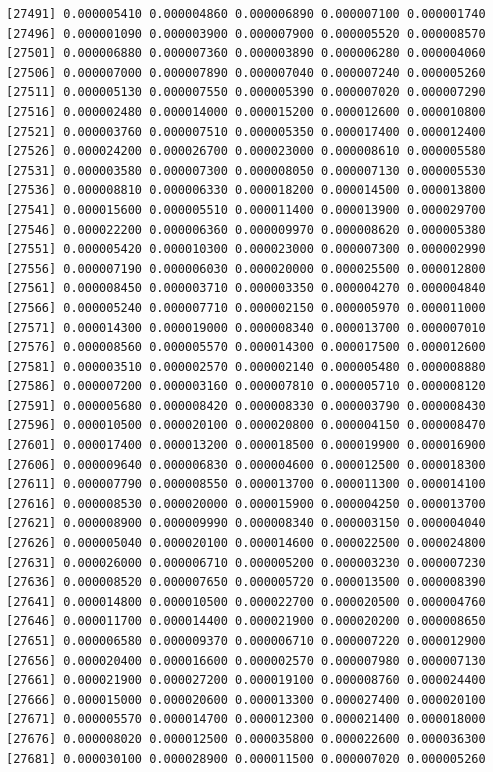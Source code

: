 \documentclass[]{article}
\begin{document}
\begin{verbatim}
[27491] 0.000005410 0.000004860 0.000006890 0.000007100 0.000001740
[27496] 0.000001090 0.000003900 0.000007900 0.000005520 0.000008570
[27501] 0.000006880 0.000007360 0.000003890 0.000006280 0.000004060
[27506] 0.000007000 0.000007890 0.000007040 0.000007240 0.000005260
[27511] 0.000005130 0.000007550 0.000005390 0.000007020 0.000007290
[27516] 0.000002480 0.000014000 0.000015200 0.000012600 0.000010800
[27521] 0.000003760 0.000007510 0.000005350 0.000017400 0.000012400
[27526] 0.000024200 0.000026700 0.000023000 0.000008610 0.000005580
[27531] 0.000003580 0.000007300 0.000008050 0.000007130 0.000005530
[27536] 0.000008810 0.000006330 0.000018200 0.000014500 0.000013800
[27541] 0.000015600 0.000005510 0.000011400 0.000013900 0.000029700
[27546] 0.000022200 0.000006360 0.000009970 0.000008620 0.000005380
[27551] 0.000005420 0.000010300 0.000023000 0.000007300 0.000002990
[27556] 0.000007190 0.000006030 0.000020000 0.000025500 0.000012800
[27561] 0.000008450 0.000003710 0.000003350 0.000004270 0.000004840
[27566] 0.000005240 0.000007710 0.000002150 0.000005970 0.000011000
[27571] 0.000014300 0.000019000 0.000008340 0.000013700 0.000007010
[27576] 0.000008560 0.000005570 0.000014300 0.000017500 0.000012600
[27581] 0.000003510 0.000002570 0.000002140 0.000005480 0.000008880
[27586] 0.000007200 0.000003160 0.000007810 0.000005710 0.000008120
[27591] 0.000005680 0.000008420 0.000008330 0.000003790 0.000008430
[27596] 0.000010500 0.000020100 0.000020800 0.000004150 0.000008470
[27601] 0.000017400 0.000013200 0.000018500 0.000019900 0.000016900
[27606] 0.000009640 0.000006830 0.000004600 0.000012500 0.000018300
[27611] 0.000007790 0.000008550 0.000013700 0.000011300 0.000014100
[27616] 0.000008530 0.000020000 0.000015900 0.000004250 0.000013700
[27621] 0.000008900 0.000009990 0.000008340 0.000003150 0.000004040
[27626] 0.000005040 0.000020100 0.000014600 0.000022500 0.000024800
[27631] 0.000026000 0.000006710 0.000005200 0.000003230 0.000007230
[27636] 0.000008520 0.000007650 0.000005720 0.000013500 0.000008390
[27641] 0.000014800 0.000010500 0.000022700 0.000020500 0.000004760
[27646] 0.000011700 0.000014400 0.000021900 0.000020200 0.000008650
[27651] 0.000006580 0.000009370 0.000006710 0.000007220 0.000012900
[27656] 0.000020400 0.000016600 0.000002570 0.000007980 0.000007130
[27661] 0.000021900 0.000027200 0.000019100 0.000008760 0.000024400
[27666] 0.000015000 0.000020600 0.000013300 0.000027400 0.000020100
[27671] 0.000005570 0.000014700 0.000012300 0.000021400 0.000018000
[27676] 0.000008020 0.000012500 0.000035800 0.000022600 0.000036300
[27681] 0.000030100 0.000028900 0.000011500 0.000007020 0.000005260

\end{verbatim}
\end{document}
